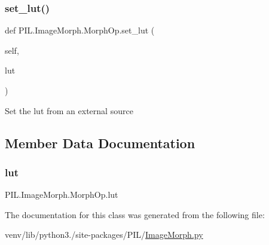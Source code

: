 \subsubsection{\texorpdfstring{set\+\_\+lut()}{set\_lut()}}
{\footnotesize\ttfamily def P\+I\+L.\+Image\+Morph.\+Morph\+Op.\+set\+\_\+lut (\begin{DoxyParamCaption}\item[{}]{self,  }\item[{}]{lut }\end{DoxyParamCaption})}

\begin{DoxyVerb}Set the lut from an external source\end{DoxyVerb}
 

\subsection{Member Data Documentation}
\mbox{\label{classPIL_1_1ImageMorph_1_1MorphOp_a2de6096e17c7ce39c6883d5eaf168c49}} 
\subsubsection{\texorpdfstring{lut}{lut}}
{\footnotesize\ttfamily P\+I\+L.\+Image\+Morph.\+Morph\+Op.\+lut}



The documentation for this class was generated from the following file\+:\begin{DoxyCompactItemize}
\item 
venv/lib/python3./site-\/packages/\+P\+I\+L/\hyperlink{ImageMorph_8py}{Image\+Morph.\+py}\end{DoxyCompactItemize}
